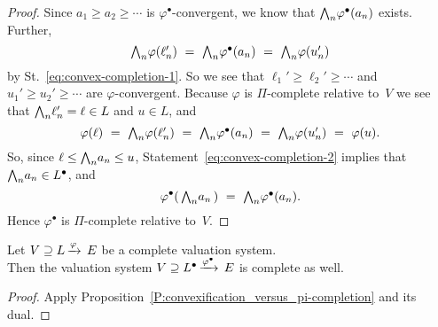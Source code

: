 \begin{proof}
Since $a_1 \geq a_2 \geq \dotsb$
is $\varphi^\bullet$-convergent,
we know that $\textstyle{\bigwedge}_n \varphi^\bullet (a_n)$ exists.
Further,
\begin{equation*}
\bw_n \varphi(\ell_n') \ =\ 
\bw_n \varphi^\bullet(a_n) \ =\ 
\bw_n \varphi(u_n')
\end{equation*}
by St.~\eqref{eq:convex-completion-1}.
So we see that
$\ell_1' \geq \ell_2' \geq \dotsb$
and $u_1'\geq u_2'\geq \dotsb$
are $\varphi$-convergent.
Because $\varphi$ is $\Pi$-complete
relative to~$V$
we see that $\textstyle{\bigwedge}_n \ell_n'=\ell\in L$
and $u\in L$,
and 
\begin{equation}
\label{eq:convex-completion-2}
\varphi(\ell) \ = \ 
\bw_n \varphi(\ell_n')\ =\ 
\bw_n \varphi^\bullet(a_n)\ = \ 
\bw_n \varphi(u_n')\ = \ 
\varphi(u).
\end{equation}
So,
since $\ell\leq \textstyle{\bigwedge}_n a_n \leq u$,
Statement~\eqref{eq:convex-completion-2} implies that
$\textstyle{\bigwedge}_n a_n \in L^\bullet$,
and 
\begin{equation*}
\varphi^\bullet(\,\bw_n a_n\,)
\ = \ 
\bw_n \varphi^\bullet(a_n).
\end{equation*}
Hence $\varphi^\bullet$ is $\Pi$-complete relative to~$V$.
\end{proof}
%
%
%
\begin{prop}
\label{P:convexification_versus_completion}
Let $V \supseteq L\,\smash{\xrightarrow{\varphi}\,E}$ be a complete valuation system.\\
Then 
the valuation system 
$V \supseteq L^\bullet\,\smash{\xrightarrow{\varphi^\bullet}\,E}$ is complete as well.
\end{prop}
\begin{proof}
Apply Proposition~\ref{P:convexification_versus_pi-completion}
and its dual.
\end{proof}
